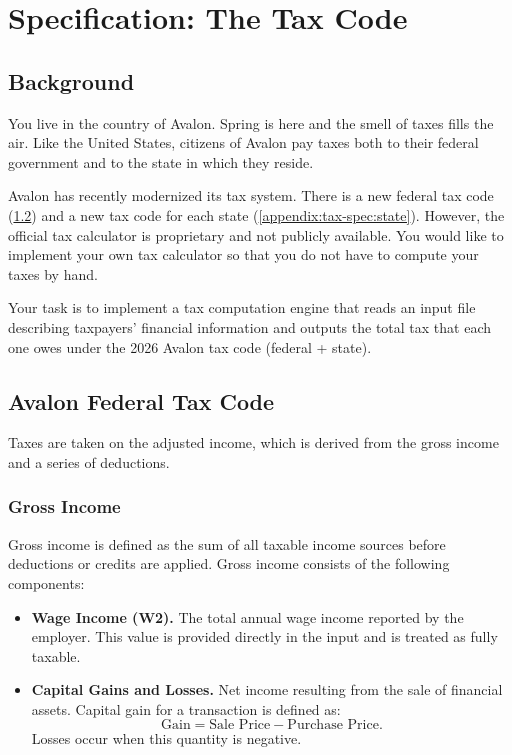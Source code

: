 \appendix

\section{Specification: The Tax Code}
\label{appendix:tax-spec}

\subsection{Background}

You live in the country of Avalon.
Spring is here and the smell of taxes fills the air.
Like the United States, citizens of Avalon pay taxes both to their federal government and to the state in which they reside.

Avalon has recently modernized its tax system.
There is a new federal tax code (\cref{appendix:tax-spec:federal}) and a new tax code for each state (\cref{appendix:tax-spec:state}).
However, the official tax calculator is proprietary and not publicly available.
You would like to implement your own tax calculator so that you do not have to compute your taxes by hand.

Your task is to implement a tax computation engine that reads an input file describing taxpayers' financial information and outputs the total tax that each one owes under the 2026 Avalon tax code (federal + state).

\subsection{Avalon Federal Tax Code}
\label{appendix:tax-spec:federal}

Taxes are taken on the adjusted income, which is derived from the gross income and a series of deductions.

\subsubsection{Gross Income}

Gross income is defined as the sum of all taxable income sources before deductions or credits are applied.
Gross income consists of the following components:

\begin{itemize}
  \item \textbf{Wage Income (W2).}  
  The total annual wage income reported by the employer.  
  This value is provided directly in the input and is treated as fully taxable.

  \item \textbf{Capital Gains and Losses.}  
  Net income resulting from the sale of financial assets.  
  Capital gain for a transaction is defined as:
  \[
  \text{Gain} = \text{Sale Price} - \text{Purchase Price}.
  \]
  Losses occur when this quantity is negative.
\end{itemize}

